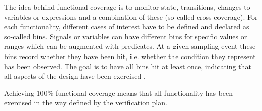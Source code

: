 \documentclass[12pt]{report}
\begin{document}
The idea behind functional coverage is to monitor state, transitions, changes to variables or expressions and a
combination of these (so-called cross-coverage). For each functionality, different cases of interest have to be
defined and declared as so-called bins. Signals or variables can have different bins for specific values or ranges
which can be augmented with predicates. At a given sampling event these bins record whether they have been hit, i.e.
whether the condition they represent has been observed. The goal is to have all bins hit at least once, indicating
that all aspects of the design have been exercised \cite[Sec. 7.6]{flake2020a}.

Achieving 100\% functional coverage means that all functionality has been exercised in the way defined by the verification plan.

\begin{comment}

\cite[Ch. 15]{mehta2021introduction}
- how to measure how well the testbench is performing?
- especially in the case of CRV this becomes essential, since it is not clear what functionality has been tested under which conditions

\cite[Ch. 2]{bergeron2012writing}
- code coverage provides insight into how much of the source code or structure of the DUV has been exercised by a test suite
- via adding instrumentation to the design, the activity of certain aspects of the design is monitored

\cite[Ch. 15]{mehta2021introduction}
- at the simplest level, line coverage checks whether a line of code has been executed
- more useful is statement coverage which looks at each statement independent of its position in the code
- branch coverage concerns itself with control flow, it measures how many of the different paths through a piece of code have been taken
- finally, FSM coverage recognizes FSM patterns in the source code
- it can report which states have been visited, which transitions have occurred
- does not know about valid transitions though, illegal ones have to be filtered out manually

- code coverage can indicate that the verification is NOT down, never whether it is done \cite[Ch. 2]{bergeron2012writing}

- a more general concept of coverage is needed, functional coverage \cite[Sec. 7]{flake2020a}
- it has to be based on the design specification, can't be derived and thus manual work \cite[Ch. 15]{mehta2021introduction}

\cite[Sec. 7]{flake2020a}
- essentially about monitoring state, state transitions, changes to variables and expressions and combinations of these (cross)
- one bin for each state, transition, cross... which corresponds to a functional aspect of the DUT
- all bins should have hits

\end{comment}
\end{document}
